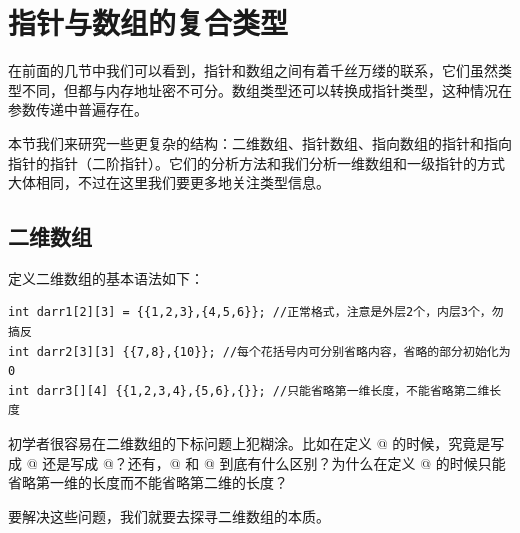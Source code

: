 \section{指针与数组的复合类型}
在前面的几节中我们可以看到，指针和数组之间有着千丝万缕的联系，它们虽然类型不同，但都与内存地址密不可分。数组类型还可以转换成指针类型，这种情况在参数传递中普遍存在。\par
本节我们来研究一些更复杂的结构：二维数组、指针数组、指向数组的指针和指向指针的指针（二阶指针）。它们的分析方法和我们分析一维数组和一级指针的方式大体相同，不过在这里我们要更多地关注类型信息。\par
\subsection*{二维数组}
定义二维数组的基本语法如下：
\begin{lstlisting}
int darr1[2][3] = {{1,2,3},{4,5,6}}; //正常格式，注意是外层2个，内层3个，勿搞反
int darr2[3][3] {{7,8},{10}}; //每个花括号内可分别省略内容，省略的部分初始化为0
int darr3[][4] {{1,2,3,4},{5,6},{}}; //只能省略第一维长度，不能省略第二维长度
\end{lstlisting}
初学者很容易在二维数组的下标问题上犯糊涂。比如在定义 @ 的时候，究竟是写成 @ 还是写成 @？还有，\lstinline@int[2][3]@ 和 \lstinline@int[3][2]@ 到底有什么区别？为什么在定义 @ 的时候只能省略第一维的长度而不能省略第二维的长度？\par
要解决这些问题，我们就要去探寻二维数组的本质。\par
